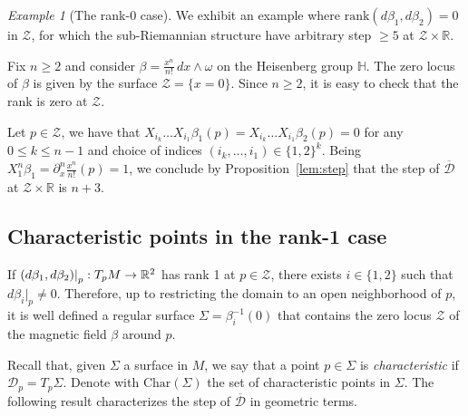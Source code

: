 \documentclass{amsart}
\theoremstyle{plain}
\theoremstyle{definition}
\theoremstyle{remark}
\newtheorem{example}[thm]{Example}
\newcommand{\red}{\color{red}}
\newcommand{\R}{\mathbb{R}}
\newcommand{\diff}{d}%
\newcommand{\p}{\partial}												%
\newcommand{\sr}{sub-{R}ie\-man\-nian }
\newcommand{\distr}{\mathcal{D}}								%
\newcommand{\B}{\beta}
\newcommand{\lift}[1]{\overline{#1}} 							%
\newcommand\restr[2]{{													%
  \left.\kern-\nulldelimiterspace 					
  #1 																			
  \right|_{#2} 														
  }}
\begin{document}
\begin{example}[The rank-0 case]
\label{exa:r0}
We exhibit an example where $\mathrm{rank}{\left(\diff \B_1,\diff \B_2\right)}=0$ in $\mathcal{Z}$, for which the \sr structure have arbitrary step $\geq 5$ at $\mathcal{Z}\times\R$.

Fix $n\geq 2$ and consider $\B=\frac{x^n}{n!}\,dx\wedge\omega$ on the Heisenberg group $\mathbb{H}$. 
The zero locus of $\beta$ is given by the surface $\mathcal{Z}=\{x=0\}$. Since $n\geq 2$, it is easy to check that the rank is zero at $\mathcal{Z}$.

Let $p\in\mathcal{Z}$, we have that $X_{i_k}\ldots X_{i_1}\B_1(p)=X_{i_k}\ldots X_{i_1}\B_2(p)=0$ for any $0\leq k \leq n-1$ and choice of indices $(i_k,\ldots,i_1)\in \{1,2\}^{k}$. 
Being $X_1^n\B_1=\p_x^n \frac{x^n}{n!}(p)=1$, we conclude by Proposition~\ref{lem:step} that the step of $\lift\distr$ at $\mathcal{Z}\times\R$ is $n+3$.

\end{example}






\subsection{Characteristic points in the rank-1 case}


If $\restr{\left(\diff \B_1,\diff \B_2\right)}{p}:T_pM\to \R^2$ has rank 1 at $p\in \mathcal{Z}$, there exists $i\in \{1,2\}$ such that $\diff \B_i|_{p}\neq 0$.
Therefore, up to restricting the domain  to an open neighborhood of $p$, it is well defined a regular surface $\Sigma=\B_{i}^{-1}(0)$ that contains the zero locus $\mathcal{Z}$ of the magnetic field $\beta$ around $p$.




Recall that, given $\Sigma$ a surface in $M$, we say that a point $p\in \Sigma$ is \emph{characteristic} if  $\distr_p=T_p\Sigma$.
Denote with $\mathrm{Char}(\Sigma)$ the set of characteristic points in $\Sigma$.
 The following result characterizes the step of $\lift \distr$ in geometric terms.

 
 
\end{document}

